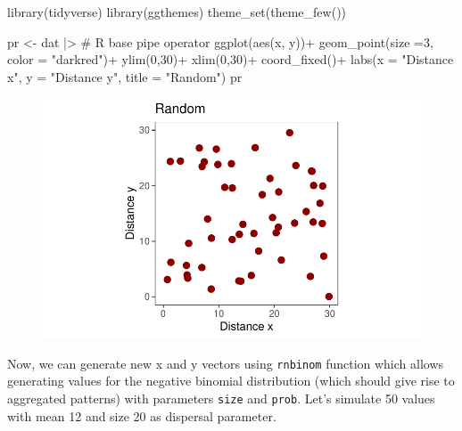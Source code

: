 \documentclass[
  letterpaper,
  DIV=11,
  numbers=noendperiod]{scrreprt}
\newenvironment{Shaded}{\begin{snugshade}}{\end{snugshade}}
\newcommand{\AttributeTok}[1]{\textcolor[rgb]{0.40,0.45,0.13}{#1}}
\newcommand{\CommentTok}[1]{\textcolor[rgb]{0.37,0.37,0.37}{#1}}
\newcommand{\DecValTok}[1]{\textcolor[rgb]{0.68,0.00,0.00}{#1}}
\newcommand{\FunctionTok}[1]{\textcolor[rgb]{0.28,0.35,0.67}{#1}}
\newcommand{\NormalTok}[1]{\textcolor[rgb]{0.00,0.23,0.31}{#1}}
\newcommand{\OtherTok}[1]{\textcolor[rgb]{0.00,0.23,0.31}{#1}}
\newcommand{\SpecialCharTok}[1]{\textcolor[rgb]{0.37,0.37,0.37}{#1}}
\newcommand{\StringTok}[1]{\textcolor[rgb]{0.13,0.47,0.30}{#1}}
\begin{document}
\begin{Shaded}
\begin{Highlighting}[]
\FunctionTok{library}\NormalTok{(tidyverse) }
\FunctionTok{library}\NormalTok{(ggthemes)}
\FunctionTok{theme\_set}\NormalTok{(}\FunctionTok{theme\_few}\NormalTok{())}

\NormalTok{pr }\OtherTok{\textless{}{-}}\NormalTok{ dat }\SpecialCharTok{|\textgreater{}} \CommentTok{\# R base pipe operator}
  \FunctionTok{ggplot}\NormalTok{(}\FunctionTok{aes}\NormalTok{(x, y))}\SpecialCharTok{+}
  \FunctionTok{geom\_point}\NormalTok{(}\AttributeTok{size =}\DecValTok{3}\NormalTok{, }
             \AttributeTok{color =} \StringTok{"darkred"}\NormalTok{)}\SpecialCharTok{+}
  \FunctionTok{ylim}\NormalTok{(}\DecValTok{0}\NormalTok{,}\DecValTok{30}\NormalTok{)}\SpecialCharTok{+}
  \FunctionTok{xlim}\NormalTok{(}\DecValTok{0}\NormalTok{,}\DecValTok{30}\NormalTok{)}\SpecialCharTok{+}
  \FunctionTok{coord\_fixed}\NormalTok{()}\SpecialCharTok{+}
  \FunctionTok{labs}\NormalTok{(}\AttributeTok{x =} \StringTok{"Distance x"}\NormalTok{, }\AttributeTok{y =} \StringTok{"Distance y"}\NormalTok{, }
       \AttributeTok{title =} \StringTok{"Random"}\NormalTok{)}
\NormalTok{pr}
\end{Highlighting}
\end{Shaded}

\begin{figure}[H]

{\centering \includegraphics{./spatial-patterns_files/figure-pdf/unnamed-chunk-4-1.pdf}

}

\end{figure}

Now, we can generate new x and y vectors using \texttt{rnbinom} function
which allows generating values for the negative binomial distribution
(which should give rise to aggregated patterns) with parameters
\texttt{size} and \texttt{prob}. Let's simulate 50 values with mean 12
and size 20 as dispersal parameter.
\end{document}
